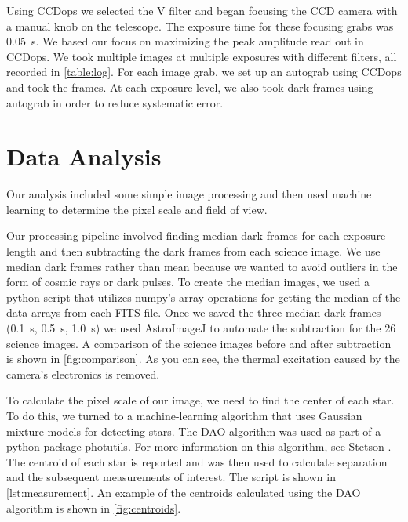 \documentclass[%
aip,
jmp,
reprint,
floatfix,
nobibfootnote,
]{revtex4-1}
\begin{document}
	Using CCDops we selected the V filter and began focusing the CCD camera with a manual knob on the telescope. The exposure time for these focusing grabs was \SI{0.05}{\second}. We based our focus on maximizing the peak amplitude read out in CCDops. We took multiple images at multiple exposures with different filters, all recorded in \autoref{table:log}. For each image grab, we set up an autograb using CCDops and took the frames. At each exposure level, we also took dark frames using autograb in order to reduce systematic error.

	\section{Data Analysis}
	
	Our analysis included some simple image processing and then used machine learning to determine the pixel scale and field of view. 
	
	Our processing pipeline involved finding median dark frames for each exposure length and then subtracting the dark frames from each science image. We use median dark frames rather than mean because we wanted to avoid outliers in the form of cosmic rays or dark pulses. To create the median images, we used a python script that utilizes numpy's array operations for getting the median of the data arrays from each FITS file. Once we saved the three median dark frames (\SI{0.1}{\second}, \SI{0.5}{\second}, \SI{1.0}{\second}) we used AstroImageJ to automate the subtraction for the 26 science images. A comparison of the science images before and after subtraction is shown in \autoref{fig:comparison}. As you can see, the thermal excitation caused by the camera's electronics is removed. 
	
	To calculate the pixel scale of our image, we need to find the center of each star. To do this, we turned to a machine-learning algorithm that uses Gaussian mixture models for detecting stars. The DAO algorithm was used as part of a python package photutils. For more information on this algorithm, see Stetson \cite{1987PASP...99..191S}. The centroid of each star is reported and was then used to calculate separation and the subsequent measurements of interest. The script is shown in \autoref{lst:measurement}. An example of the centroids calculated using the DAO algorithm is shown in \autoref{fig:centroids}.
	
\end{document}
